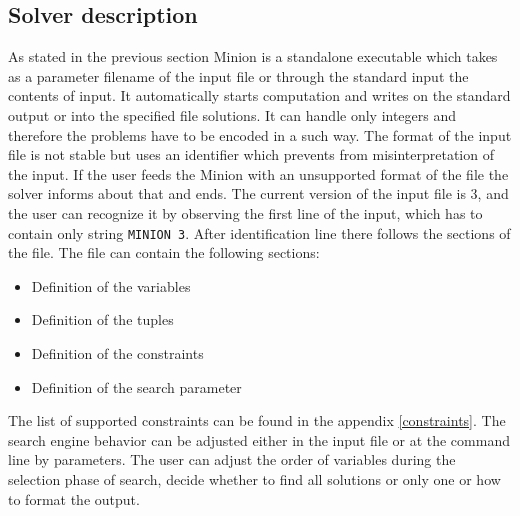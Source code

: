 \subsection{Solver description}
As stated in the previous section Minion is a standalone executable which takes as a parameter
filename of the input file or through the standard input the contents of input.
It automatically starts computation and writes on the standard output or into the
specified file solutions. It can handle only integers and therefore the problems have to
be encoded in a such way. The format of the input file is not stable but uses an identifier
which prevents from misinterpretation of the input. If the user feeds the Minion with 
an unsupported format of the file the solver informs about that and ends. The current version
of the input file is 3, and the user can recognize it by observing the first line of the input, which
has to contain only string \texttt{MINION 3}. After identification line there follows the sections
of the file. The file can contain the following sections:

\begin{itemize}
  \item Definition of the variables
  \item Definition of the tuples
  \item Definition of the constraints
  \item Definition of the search parameter
\end{itemize}

The list of supported constraints can be found in the appendix \ref{constraints}.
The search engine behavior can be adjusted either in the input file or at the command line
by parameters. The user can adjust the order of variables during the selection phase of search,
decide whether to find all solutions or only one or how to format the output.

